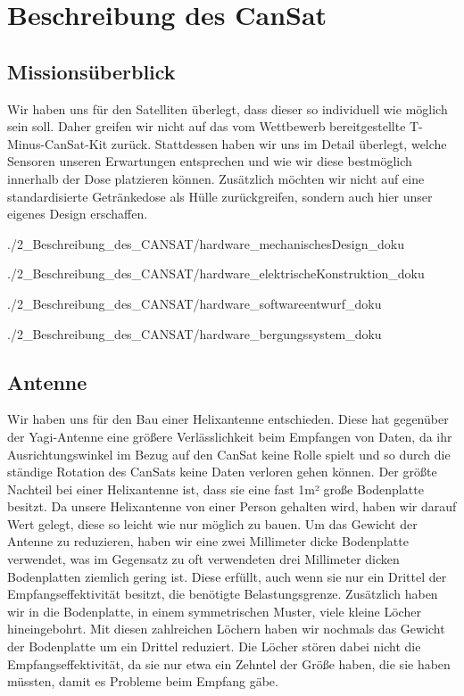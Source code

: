 \section{Beschreibung des CanSat}


\subsection{Missionsüberblick}
Wir haben uns für den Satelliten überlegt, dass dieser so individuell wie möglich sein soll. Daher greifen wir nicht auf das vom Wettbewerb bereitgestellte T-Minus-CanSat-Kit zurück. Stattdessen haben wir uns im Detail überlegt, welche Sensoren unseren Erwartungen entsprechen und wie wir diese bestmöglich innerhalb der Dose platzieren können. Zusätzlich möchten wir nicht auf eine standardisierte Getränkedose als Hülle zurückgreifen, sondern auch hier unser eigenes Design erschaffen.

 {./2_Beschreibung_des_CANSAT/hardware_mechanischesDesign_doku}

 {./2_Beschreibung_des_CANSAT/hardware_elektrischeKonstruktion_doku}

 {./2_Beschreibung_des_CANSAT/hardware_softwareentwurf_doku}

 {./2_Beschreibung_des_CANSAT/hardware_bergungssystem_doku}

\subsection{Antenne}
Wir haben uns für den Bau einer Helixantenne entschieden. Diese hat gegenüber der Yagi-Antenne eine größere Verlässlichkeit beim Empfangen von Daten, da ihr Ausrichtungswinkel im Bezug auf den CanSat keine Rolle spielt und so durch die ständige Rotation des CanSats keine Daten verloren gehen können. Der größte Nachteil bei einer Helixantenne ist, dass sie eine fast 1m² große Bodenplatte besitzt. Da unsere Helixantenne von einer Person gehalten wird, haben wir darauf Wert gelegt, diese so leicht wie nur möglich zu bauen. Um das Gewicht der Antenne zu reduzieren, haben wir eine zwei Millimeter dicke Bodenplatte verwendet, was im Gegensatz zu oft verwendeten drei Millimeter dicken Bodenplatten ziemlich gering ist. Diese erfüllt, auch wenn sie nur ein Drittel der Empfangseffektivität besitzt, die benötigte Belastungsgrenze. Zusätzlich haben wir in die Bodenplatte, in einem symmetrischen Muster, viele kleine Löcher hineingebohrt. Mit diesen zahlreichen Löchern haben wir nochmals das Gewicht der Bodenplatte um ein Drittel reduziert. Die Löcher stören dabei nicht die Empfangseffektivität, da sie nur etwa ein Zehntel der Größe haben, die sie haben müssten, damit es Probleme beim Empfang gäbe.

